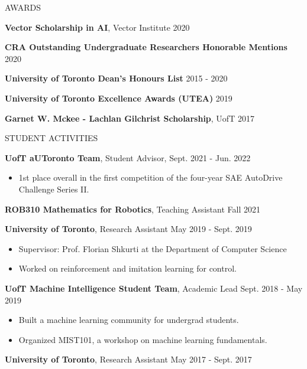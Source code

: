 \documentclass{cv}
\begin{document}
\begin{rSection}{AWARDS}
  \item \textbf{Vector Scholarship in AI}, Vector Institute \hfill 2020
  \item \textbf{CRA Outstanding Undergraduate Researchers Honorable Mentions} \hfill 2020
  \item \textbf{University of Toronto Dean's Honours List} \hfill 2015 - 2020
  \item \textbf{University of Toronto Excellence Awards (UTEA)} \hfill 2019
  \item \textbf{Garnet W. Mckee - Lachlan Gilchrist Scholarship}, UofT \hfill 2017
\end{rSection}

\begin{rSection}{STUDENT ACTIVITIES}
  \item \textbf{UofT aUToronto Team}, Student Advisor,  \hfill Sept. 2021 - Jun. 2022
  \vspace{-0.25em}
  \begin{itemize}[noitemsep,topsep=0pt]
    \item 1st place overall in the first competition of the four-year SAE AutoDrive Challenge Series II.
  \end{itemize}
  \item \textbf{ROB310 Mathematics for Robotics}, Teaching Assistant \hfill Fall 2021
  \item \textbf{University of Toronto}, Research Assistant \hfill May 2019 - Sept. 2019
  \vspace{-0.25em}
  \begin{itemize}[noitemsep,topsep=0pt]
    \item Supervisor: Prof. Florian Shkurti at the Department of Computer Science
    \item Worked on reinforcement and imitation learning for control.
  \end{itemize}
  \item \textbf{UofT Machine Intelligence Student Team}, Academic Lead \hfill Sept. 2018 - May 2019
  \vspace{-0.25em}
  \begin{itemize}[noitemsep,topsep=0pt]
    \item Built a machine learning community for undergrad students.
    \item Organized MIST101, a workshop on machine learning fundamentals.
  \end{itemize}
  \item \textbf{University of Toronto}, Research Assistant \hfill May 2017 - Sept. 2017

\end{rSection}
\end{document}
